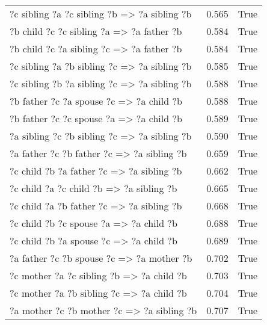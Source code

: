 \begin{longtable}{lrl}
   ?c  sibling  ?a  ?c  sibling  ?b   => ?a  sibling  ?b &           0.565 &                     True \\
      ?b  child  ?c  ?c  sibling  ?a   => ?a  father  ?b &           0.584 &                     True \\
      ?b  child  ?c  ?a  sibling  ?c   => ?a  father  ?b &           0.584 &                     True \\
   ?c  sibling  ?a  ?b  sibling  ?c   => ?a  sibling  ?b &           0.585 &                     True \\
   ?c  sibling  ?b  ?a  sibling  ?c   => ?a  sibling  ?b &           0.588 &                     True \\
       ?b  father  ?c  ?a  spouse  ?c   => ?a  child  ?b &           0.588 &                     True \\
       ?b  father  ?c  ?c  spouse  ?a   => ?a  child  ?b &           0.589 &                     True \\
   ?a  sibling  ?c  ?b  sibling  ?c   => ?a  sibling  ?b &           0.590 &                     True \\
     ?a  father  ?c  ?b  father  ?c   => ?a  sibling  ?b &           0.659 &                     True \\
      ?c  child  ?b  ?a  father  ?c   => ?a  sibling  ?b &           0.662 &                     True \\
       ?c  child  ?a  ?c  child  ?b   => ?a  sibling  ?b &           0.665 &                     True \\
      ?c  child  ?a  ?b  father  ?c   => ?a  sibling  ?b &           0.668 &                     True \\
        ?c  child  ?b  ?c  spouse  ?a   => ?a  child  ?b &           0.688 &                     True \\
        ?c  child  ?b  ?a  spouse  ?c   => ?a  child  ?b &           0.689 &                     True \\
      ?a  father  ?c  ?b  spouse  ?c   => ?a  mother  ?b &           0.702 &                     True \\
      ?c  mother  ?a  ?c  sibling  ?b   => ?a  child  ?b &           0.703 &                     True \\
      ?c  mother  ?a  ?b  sibling  ?c   => ?a  child  ?b &           0.704 &                     True \\
     ?a  mother  ?c  ?b  mother  ?c   => ?a  sibling  ?b &           0.707 &                     True \\

\end{longtable}
